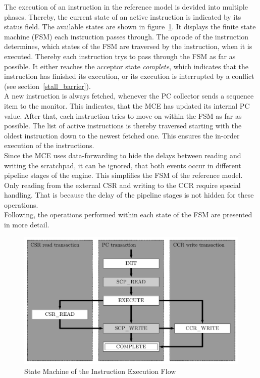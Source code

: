 The execution of an instruction in the reference model is devided into multiple phases.
Thereby, the current state of an active instruction is indicated by its status field.
The available states are shown in figure~\ref{fig:ref_model_phases}.
It displays the finite state machine (FSM) each instruction passes through.
The opcode of the instruction determines, which states of the FSM are traversed by the instruction, when it is executed.
Thereby each instruction trys to pass through the FSM as far as possible.
It either reaches the acceptor state \emph{complete}, which indicates that the instruction has finished its execution, or its execution is interrupted by a
conflict (see section~\ref{stall_barrier}).\\
A new instruction is always fetched, whenever the PC collector sends a sequence item to the monitor.
This indicates, that the MCE has updated its internal PC value.
After that, each instruction tries to move on within the FSM as far as possible.
The list of active instructions is thereby traversed starting with the oldest instruction down to the newest fetched one.
This ensures the in-order execution of the instructions.\\
Since the MCE uses data-forwarding to hide the delays between reading and writing the scratchpad, it can be ignored, that both events occur in different
pipeline stages of the engine.
This simplifies the FSM of the reference model.
Only reading from the external CSR and writing to the CCR require special handling.
That is because the delay of the pipeline stages is not hidden for these operations.\\
Following, the operations performed within each state of the FSM are presented in more detail.

\begin{figure}[htb]
 \centering
 \includegraphics[width=1.0\textwidth,angle=0]{images/ref_model_phases}
 \caption{State Machine of the Instruction Execution Flow}
\label{fig:ref_model_phases}
\end{figure}

